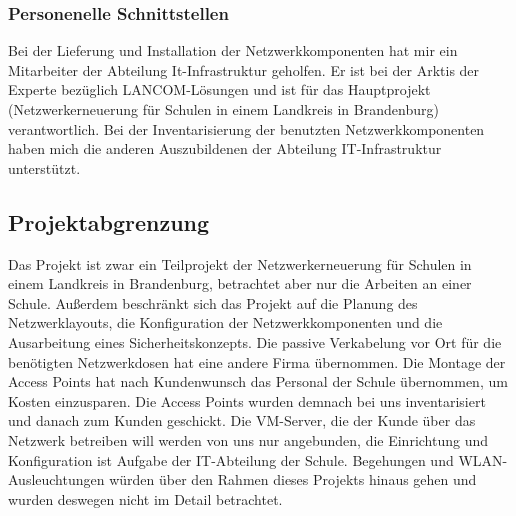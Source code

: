 \subsubsection{Personenelle Schnittstellen}
Bei der Lieferung und Installation der Netzwerkkomponenten hat mir ein Mitarbeiter der Abteilung It-Infrastruktur geholfen. 
Er ist bei der \ac{Arktis} der Experte bezüglich LANCOM-Lösungen und ist für das Hauptprojekt (Netzwerkerneuerung für Schulen in einem Landkreis in Brandenburg) verantwortlich. 
Bei der Inventarisierung der benutzten Netzwerkkomponenten haben mich die anderen Auszubildenen der Abteilung IT-Infrastruktur unterstützt. 
\begin{comment}
	\item Mit welchen anderen Systemen interagiert die Anwendung (technische Schnittstellen)?
	\item Wer genehmigt das Projekt \bzw stellt Mittel zur Verfügung? 
	\item Wer sind die Benutzer der Anwendung?
	\item Wem muss das Ergebnis präsentiert werden?
\end{comment}


\subsection{Projektabgrenzung} 
\label{sec:Projektabgrenzung}
Das Projekt ist zwar ein Teilprojekt der Netzwerkerneuerung für Schulen in einem Landkreis in Brandenburg, betrachtet aber nur die Arbeiten an einer Schule. 
Außerdem beschränkt sich das Projekt auf die Planung des Netzwerklayouts, die Konfiguration der Netzwerkkomponenten und die Ausarbeitung eines Sicherheitskonzepts. 
Die passive Verkabelung vor Ort für die benötigten Netzwerkdosen hat eine andere Firma übernommen. 
Die Montage der Access Points hat nach Kundenwunsch das Personal der Schule übernommen, um Kosten einzusparen. 
Die Access Points wurden demnach bei uns inventarisiert und danach zum Kunden geschickt. Die VM-Server, die der Kunde über das Netzwerk betreiben will werden von uns nur angebunden, die Einrichtung und Konfiguration ist Aufgabe der IT-Abteilung der Schule.
Begehungen und WLAN-Ausleuchtungen würden über den Rahmen dieses Projekts hinaus gehen und wurden deswegen nicht im Detail betrachtet.
\begin{comment}
	\item Was ist explizit nicht Teil des Projekts (\insb bei Teilprojekten)?
\end{comment}
